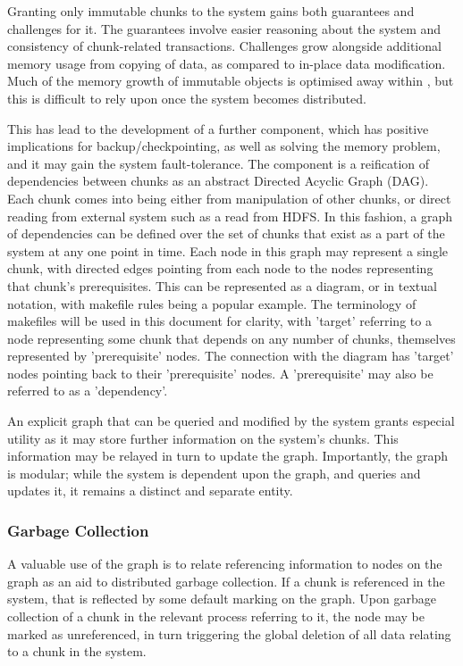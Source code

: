 Granting only immutable chunks to the \lsr{} system gains both guarantees and challenges for it.
The guarantees involve easier reasoning about the system and consistency of chunk-related transactions\cite{goetz2006java}.
Challenges grow alongside additional memory usage from copying of data, as compared to in-place data modification.
Much of the memory growth of immutable objects is optimised away within \R{}, but this is difficult to rely upon once the system becomes distributed\cite{rcore2020lang}.

This has lead to the development of a further component, which has positive implications for backup/checkpointing, as well as solving the memory problem, and it may gain the system fault-tolerance.
The component is a reification of dependencies between chunks as an abstract Directed Acyclic Graph (DAG).
Each chunk comes into being either from manipulation of other chunks, or direct reading from external system such as a read from HDFS.
In this fashion, a graph of dependencies can be defined over the set of chunks that exist as a part of the system at any one point in time.
Each node in this graph may represent a single chunk, with directed edges pointing from each node to the nodes representing that chunk's prerequisites.
This can be represented as a diagram, or in textual notation, with makefile rules being a popular example\cite{shal2009build}.
The terminology of makefiles will be used in this document for clarity, with 'target' referring to a node representing some chunk that depends on any number of chunks, themselves represented by 'prerequisite' nodes.
The connection with the diagram has 'target' nodes pointing back to their 'prerequisite' nodes.
A 'prerequisite' may also be referred to as a 'dependency'.

An explicit graph that can be queried and modified by the system grants especial utility as it may store further information on the system's chunks.
This information may be relayed in turn to update the graph.
Importantly, the graph is modular; while the system is dependent upon the graph, and queries and updates it, it remains a distinct and separate entity.

\subsubsection{Garbage Collection}\label{sec:gc}

A valuable use of the graph is to relate referencing information to nodes on the graph as an aid to distributed garbage collection.
If a chunk is referenced in the system, that is reflected by some default marking on the graph.
Upon garbage collection of a chunk in the relevant \R{} process referring to it, the node may be marked as unreferenced, in turn triggering the global deletion of all data relating to a chunk in the system.

